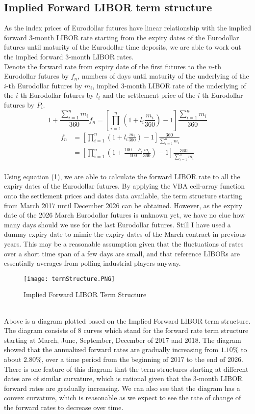 \subsection{Implied Forward LIBOR term structure}
As the index prices of Eurodollar futures have linear relationship with the implied forward 3-month LIBOR rate starting from the expiry dates of the Eurodollar futures until maturity of the Eurodollar time deposits, we are able to work out the implied forward 3-month LIBOR rates.\\[4mm]
Denote the forward rate from expiry date of the first futures to the $n$-th Eurodollar futures by $f_{n}$, numbers of days until maturity of the underlying of the $i$-th Eurodollar futures by $m_{i}$, implied 3-month LIBOR rate of the underlying of the $i$-th Eurodollar futures by $l_{i}$ and the settlement price of the $i$-th Eurodollar futures by $P_{i}$.\\[4mm]
$$1 + \frac{\sum_{i=1}^{n} m_{i}}{360}f_{n} = [\prod_{i=1}^{n} (1 + l_{i}\frac{m_{i}}{360}) - 1] \frac{\sum_{i=1}^{n} m_{i}}{360}$$
\begin{equation}
\begin{split}
f_{n} &= [\prod_{i=1}^{n} (1 + l_{i}\frac{m_{i}}{360}) - 1] \frac{360}{\sum_{i=1}^{n} m_{i}}\\
&= [\prod_{i=1}^{n} (1 + \frac{100 - P_{i}}{100}\frac{m_{i}}{360}) - 1] \frac{360}{\sum_{i=1}^{n} m_{i}}
\end{split}
\end{equation}
\\[4mm]Using equation (1), we are able to calculate the forward LIBOR rate to all the expiry dates of the Eurodollar futures. By applying the VBA cell-array function onto the settlement prices and dates data available, the term structure starting from March 2017 until December 2026 can be obtained. However, as the expiry date of the 2026 March Eurodollar futures is unknown yet, we have no clue how many days should we use for the last Eurodollar futures. Still I have used a dummy expiry date to mimic the expiry dates of the March contract in previous years. This may be a reasonable assumption given that the fluctuations of rates over a short time span of a few days are small, and that reference LIBORs are essentially averages from polling industrial players anyway.
\begin{figure}[h]
	\centering
	\texttt{[image: termStructure.PNG]}
	\caption{Implied Forward LIBOR Term Structure}
\end{figure}
\\[2mm]Above is a diagram plotted based on the Implied Forward LIBOR term structure. The diagram consists of 8 curves which stand for the forward rate term structure starting at March, June, September, December of 2017 and 2018. The diagram showed that the annualized forward rates are gradually increasing from $1.10\%$ to about $2.80\%$, over a time period from the beginning of 2017 to the end of 2026. There is one feature of this diagram that the term structures starting at different dates are of similar curvature, which is rational given that the 3-month LIBOR forward rates are gradually increasing. We can also see that the diagram has a convex curvature, which is reasonable as we expect to see the rate of change of the forward rates to decrease over time.
